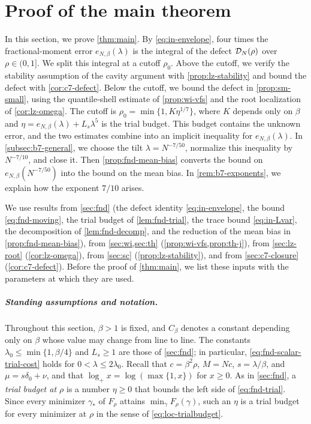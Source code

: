 \chapter{Proof of the main theorem}\label{sec:b7}

In this section, we prove \cref{thm:main}. By \eqref{eq:in-envelope},
four times the fractional-moment error $e_{N,\beta}(\lambda)$ is the
integral of the defect $\mathcal D_N(\rho)$ over $\rho\in(0,1]$. We split
this integral at a cutoff $\rho_0$. Above the cutoff, we verify the
stability assumption of the cavity argument with
\cref{prop:lz-stability} and bound the defect with
\cref{cor:c7-defect}. Below the cutoff, we bound the defect in \cref{prop:sm-small}, using the
quantile-shell estimate of \cref{prop:wi-vfs} and the root localization
of \cref{cor:lz-omega}. The cutoff is $\rho_0=\min\{1,K\eta^{1/7}\}$,
where $K$ depends only on $\beta$ and
$\eta=e_{N,\beta}(\lambda)+L_s\lambda^5$ is the trial budget. This budget
contains the unknown error, and the two estimates combine
into an implicit inequality for $e_{N,\beta}(\lambda)$. In
\cref{subsec:b7-general}, we choose the tilt $\lambda=N^{-7/50}$,
normalize this inequality by $N^{-7/10}$, and close it. Then
\cref{prop:fnd-mean-bias} converts the bound on
$e_{N,\beta}(N^{-7/50})$ into the bound on the mean bias. In
\cref{rem:b7-exponents}, we explain how the exponent $7/10$ arises.

We use results from \cref{sec:fnd} (the defect identity
\eqref{eq:in-envelope}, the bound \eqref{eq:fnd-moving}, the
trial budget of \cref{lem:fnd-trial}, the trace bound \eqref{eq:in-Lvar},
the decomposition of \cref{lem:fnd-decomp}, and the reduction of the
mean bias in \cref{prop:fnd-mean-bias}), from \cref{sec:wi,sec:th}
(\cref{prop:wi-vfs,prop:th-j}), from \cref{sec:lz-root}
(\cref{cor:lz-omega}), from \cref{sec:sc} (\cref{prop:lz-stability}), and
from \cref{sec:c7-closure} (\cref{cor:c7-defect}). Before the proof of
\cref{thm:main}, we list these inputs with the parameters at which they
are used.

\paragraph{Standing assumptions and notation.} Throughout this section,
$\beta>1$ is fixed, and $C_\beta$ denotes a constant depending only on
$\beta$ whose value may change from line to line. The constants
$\lambda_0\le\min\{1,\beta/4\}$ and $L_s\ge1$ are those of
\cref{sec:fnd}; in particular, \eqref{eq:fnd-scalar-trial-cost} holds
for $0<\lambda\le2\lambda_0$. Recall that $c=\beta^2\rho$, $M=Nc$,
$s=\lambda/\beta$, and $\mu=s\delta_0+\nu$, and that
$\log_+x=\log(\max\{1,x\})$ for $x\ge0$. As in \cref{sec:fnd}, a
\emph{trial budget at $\rho$} is a number $\eta\ge0$ that bounds the left
side of \eqref{eq:fnd-trial}. Since every minimizer $\gamma_*$ of
$F_\rho$ attains $\min_\gamma F_\rho(\gamma)$, such an $\eta$ is a trial
budget for every minimizer at $\rho$ in the sense of
\eqref{eq:loc-trialbudget}.

